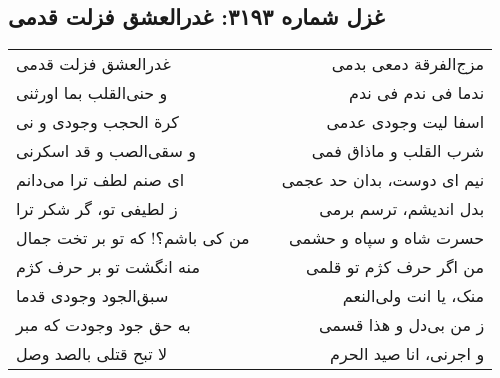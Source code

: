 \begin{center}
\section*{غزل شماره ۳۱۹۳: غدرالعشق فزلت قدمی}
\label{sec:3193}
\begin{longtable}{l p{0.5cm} r}
غدرالعشق فزلت قدمی
&&
مزج‌الفرقة دمعی بدمی
\\
و حنی‌القلب بما اورثنی
&&
ندما فی ندم فی ندم
\\
کرة الحجب وجودی و نی
&&
اسفا لیت وجودی عدمی
\\
و سقی‌الصب و قد اسکرنی
&&
شرب القلب و ماذاق فمی
\\
ای صنم لطف ترا می‌دانم
&&
نیم ای دوست، بدان حد عجمی
\\
ز لطیفی تو، گر شکر ترا
&&
بدل اندیشم، ترسم برمی
\\
من کی باشم؟! که تو بر تخت جمال
&&
حسرت شاه و سپاه و حشمی
\\
منه انگشت تو بر حرف کژم
&&
من اگر حرف کژم تو قلمی
\\
سبق‌الجود وجودی قدما
&&
منک، یا انت ولی‌النعم
\\
به حق جود وجودت که مبر
&&
ز من بی‌دل و هذا قسمی
\\
لا تبح قتلی بالصد وصل
&&
و اجرنی، انا صید الحرم
\\
\end{longtable}
\end{center}
